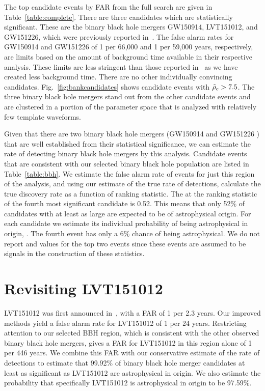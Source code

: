 The top candidate events by FAR from the full search are given in Table~\ref{table:complete}. There are three candidates which are statistically significant. These are the binary black hole mergers GW150914, LVT151012, and GW151226, which were previously reported in~\cite{TheLIGOScientific:2016pea,Abbott:2016blz,Abbott:2016nmj}. The false alarm rates for GW150914 and GW151226 of 1 per 66,000 and 1 per 59,000 years, respectively, are limits based on the amount of background time available in their respective analysis. These limits are less stringent than those reported in~\cite{TheLIGOScientific:2016pea} as we have created less background time. There are no other individually convincing candidates. Fig.~\ref{fig:bankcandidates} shows candidate events with $\tilde{\rho}_c > 7.5$. The three binary black hole mergers stand out from the other candidate events and are clustered in a portion of the parameter space that is analyzed with relatively few template waveforms.

Given that there are two binary black hole mergers (GW150914 and GW151226 ) that are well established from their
statistical significance, we can estimate the rate of detecting binary black hole mergers by this analysis. Candidate
events that are consistent with our selected binary black hole population are listed in
Table~\ref{table:bbh}. We estimate the false alarm rate of events for just this region of the analysis, and using our
estimate of the true rate of detections, calculate the true discovery rate as a function of ranking statistic. The
\tdr{} at the ranking statistic of the fourth most significant candidate is 0.52. This means that only 52\% of
candidates with \rankingstat{} at least as large are expected to be of astrophysical origin. For each candidate we estimate its
individual probability of being astrophysical in origin, \pastro{}. The fourth event has only a 6$\%$ chance of being
astrophysical. We do not report \pastro{} and \tdr{} values for the top two events since these events
are assumed to be signals in the construction of these statistics.


\section{Revisiting LVT151012}

LVT151012 was first announced in~\cite{TheLIGOScientific:2016qqj}, with a FAR
of 1 per 2.3 years. Our improved methods yield a false alarm rate for LVT151012
of 1 per 24 years. Restricting attention to our selected BBH region, which is
consistent with the other observed binary black hole mergers, gives a FAR for
LVT151012 in this region alone of 1 per 446 years. We combine this FAR  with
our conservative estimate of the rate of detections to estimate that 99.92\% of
binary black hole merger candidates at least as significant as LVT151012 are
astrophysical in origin. We also estimate the probability that specifically
LVT151012 is astrophysical in origin to be 97.59$\%$.


